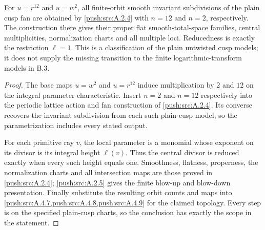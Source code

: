 \begin{corollary}\label{push:src:B.2.3}\label{push:B23}
For $u=r^{12}$ and $u=w^2$, all finite-orbit smooth invariant
subdivisions of the plain cusp fan are obtained by \ref{push:src:A.2.4}
with $n=12$ and $n=2$, respectively. The construction there
gives their proper flat smooth-total-space families,
central multiplicities, normalization charts and all
multiple loci. Reducedness is exactly the restriction
$\ell=1$. This is a classification of the plain untwisted
cusp models; it does not supply the missing transition to
the finite logarithmic-transform models in B.3.
\end{corollary}
\begin{proof}

The base maps $u=w^2$ and $u=r^{12}$ induce multiplication by
$2$ and $12$ on the integral parameter characteristic. Insert
$n=2$ and $n=12$ respectively into the periodic lattice action
and fan construction of \ref{push:src:A.2.4}. Its converse
recovers the invariant subdivision from each such plain-cusp
model, so the parametrization includes every stated output.

For each primitive ray $v$, the local parameter is a monomial
whose exponent on its divisor is its integral height $\ell(v)$.
Thus the central divisor is reduced exactly when every such
height equals one. Smoothness, flatness, properness, the
normalization charts and all intersection maps are those proved
in \ref{push:src:A.2.4}; \ref{push:src:A.2.5} gives the finite
blow-up and blow-down presentation. Finally substitute the
resulting orbit counts and maps into
\ref{push:src:A.4.7,push:src:A.4.8,push:src:A.4.9} for the
claimed topology. Every step is on the specified plain-cusp
charts, so the conclusion has exactly the scope in the statement.

\end{proof}
